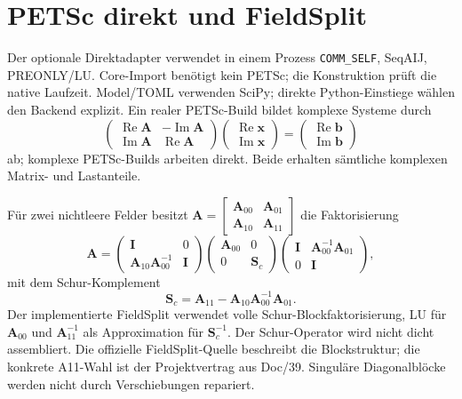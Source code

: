 \section{PETSc direkt und FieldSplit}
Der optionale Direktadapter verwendet in einem Prozess \texttt{COMM\_SELF},
SeqAIJ, PREONLY/LU. Core-Import benötigt kein PETSc; die Konstruktion prüft die
native Laufzeit. Model/TOML verwenden SciPy; direkte Python-Einstiege wählen
den Backend explizit. Ein realer PETSc-Build bildet komplexe Systeme durch
\begin{equation}\label{eq:complex-embed}
\begin{pmatrix}\operatorname{Re}\mathbf A&-\operatorname{Im}\mathbf A\\
\operatorname{Im}\mathbf A&\operatorname{Re}\mathbf A\end{pmatrix}
\begin{pmatrix}\operatorname{Re}\mathbf x\\\operatorname{Im}\mathbf x\end{pmatrix}
=\begin{pmatrix}\operatorname{Re}\mathbf b\\\operatorname{Im}\mathbf b\end{pmatrix}
\end{equation}
ab; komplexe PETSc-Builds arbeiten direkt. Beide erhalten sämtliche
komplexen Matrix- und Lastanteile.

Für zwei nichtleere Felder besitzt
$\mathbf A=\left[\begin{smallmatrix}\mathbf A_{00}&\mathbf A_{01}\\
\mathbf A_{10}&\mathbf A_{11}\end{smallmatrix}\right]$ die Faktorisierung
\begin{equation}\label{eq:schur-factor}
\mathbf A=
\begin{pmatrix}\mathbf I&0\\\mathbf A_{10}\mathbf A_{00}^{-1}&\mathbf I\end{pmatrix}
\begin{pmatrix}\mathbf A_{00}&0\\0&\mathbf S_c\end{pmatrix}
\begin{pmatrix}\mathbf I&\mathbf A_{00}^{-1}\mathbf A_{01}\\0&\mathbf I\end{pmatrix},
\end{equation}
mit dem Schur-Komplement
\begin{equation}
\mathbf S_c=\mathbf A_{11}-\mathbf A_{10}\mathbf A_{00}^{-1}\mathbf A_{01}.
\end{equation}
Der implementierte FieldSplit verwendet volle Schur-Blockfaktorisierung,
LU für $\mathbf A_{00}$ und $\mathbf A_{11}^{-1}$ als Approximation für
$\mathbf S_c^{-1}$. Der Schur-Operator wird nicht dicht assembliert.
Die offizielle FieldSplit-Quelle \cite{petsc-fieldsplit} beschreibt die
Blockstruktur; die konkrete A11-Wahl ist der Projektvertrag aus Doc/39.
Singuläre Diagonalblöcke werden nicht durch Verschiebungen repariert.

